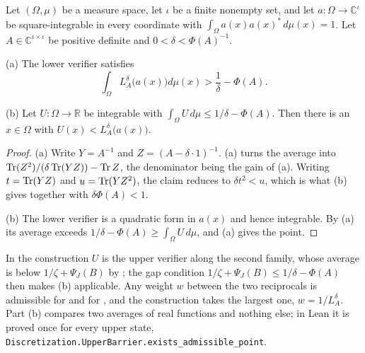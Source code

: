 \begin{lemma}
\label{lem:lower-verifier-on-average}
\leanok
{}
Let $(\Omega, \mu)$ be a measure space, let $\iota$ be a finite nonempty set, and let
$a : \Omega \to \mathbb{C}^{\iota}$ be square-integrable in every coordinate with
$\int_\Omega a(x) a(x)^* \, d\mu(x) = 1$. Let $A \in \mathbb{C}^{\iota \times \iota}$ be
positive definite and $0 < \delta < \Phi(A)^{-1}$.

(a) The lower verifier satisfies
\[
  \int_\Omega L_A^{\delta}\bigl( a(x) \bigr) d\mu(x) > \frac{1}{\delta} - \Phi(A).
\]

(b) Let $U : \Omega \to \mathbb{R}$ be integrable with
$\int_\Omega U \, d\mu \leq 1/\delta - \Phi(A)$. Then there is an $x \in \Omega$ with
$U(x) < L_A^{\delta}\bigl( a(x) \bigr)$.
\end{lemma}

\begin{proof}
\leanok
{}
(a) Write $Y = A^{-1}$ and $Z = (A - \delta \cdot 1)^{-1}$. (a)
turns the average into $\operatorname{Tr} (Z^2) / (\delta \operatorname{Tr} (Y Z)) - \operatorname{Tr} Z$, the denominator being the
gain of (a). Writing $t = \operatorname{Tr} (Y Z)$ and $u = \operatorname{Tr} (Y Z^2)$, the
claim reduces to $\delta t^2 < u$, which is what (b) gives
together with $\delta \Phi(A) < 1$.

(b) The lower verifier is a quadratic form in $a(x)$ and hence integrable. By (a) its
average exceeds $1/\delta - \Phi(A) \geq \int_\Omega U \, d\mu$, and
(a) gives the point.
\end{proof}

In the construction $U$ is the upper verifier along the second family, whose average is
below $1/\zeta + \Psi_J(B)$ by ; the gap condition
$1/\zeta + \Psi_J(B) \leq 1/\delta - \Phi(A)$ then makes (b) applicable. Any weight $w$
between the two reciprocals is admissible for  and for
, and the construction takes the largest one,
$w = 1/L_A^{\delta}$. Part (b) compares two averages of real functions and nothing else; in
Lean it is proved once for every upper state,
\texttt{Discretization.UpperBarrier.exists\_admissible\_point}.

